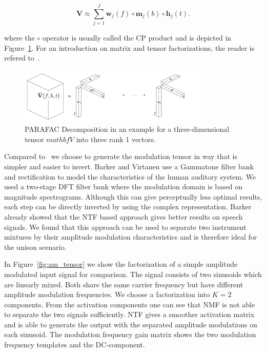 \begin{equation}
   \mathbf{V} \approx \sum\limits_{j=1}^{J} \mathbf{w}_{j}(f) \circ \mathbf{m}_{j}(b) \circ \mathbf{h}_{j}(t).
\end{equation}

where the \(\circ\) operator is usually called the CP product and is depicted in Figure~\ref{fig:cpd}.
For an introduction on matrix and tensor factorizations, the reader is refered to~\cite{cichocki09}.

\begin{figure}
  \centering
  \includegraphics[width=0.8\textwidth]{Chapters/06_Separation_Unknown/figures/cpd.pdf}
  \caption{PARAFAC Decomposition in an example for a three-dimensional tensor \(mathbf{V}\) into three rank 1 vectors.}
  \label{fig:cpd}
\end{figure}
\par
Compared to~\cite{barker13} we choose to generate the modulation tensor in way that is simpler and easier to invert. Barker and Virtanen use a Gammatone filter bank and  rectification to model the characteristics of the human auditory system. We used a two-stage DFT filter bank where the modulation domain is based on  magnitude spectrograms. Although this can give perceptually less optimal results, each step can be directly inverted by using the complex representation. Barker already showed that the NTF based approach gives better results on speech signals. We found that this approach can be used to separate two instrument mixtures by their amplitude modulation characteristics and is therefore ideal for the unison scenario.

In Figure~\ref{fig:am_tensor} we show the factorization of a simple amplitude modulated input signal for comparison. The signal consists of two sinusoids which are linearly mixed. Both share the same carrier frequency but have different amplitude modulation frequencies. We choose a factorization into $K=2$ components. From the activation components one can see that NMF is not able to separate the two signals sufficiently. NTF gives a smoother activation matrix and is able to generate the output with the separated amplitude modulations on each sinusoid. The modulation frequency gain matrix shows the two modulation frequency templates and the DC-component.

